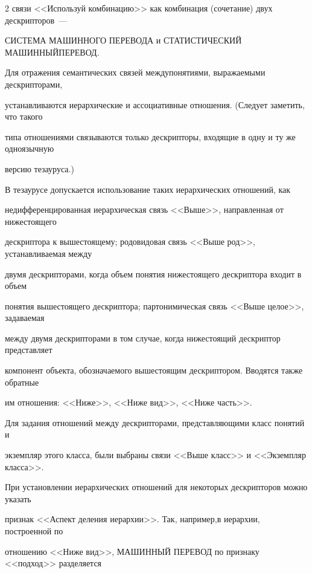 \begin{multicols}{2}
связи <<Используй комбинацию>> как комбинация (сочетание) двух дескрипторов~--- 

СИСТЕМА МАШИННОГО ПЕРЕВОДА и СТАТИСТИЧЕСКИЙ МАШИННЫЙ\linebreak  ПЕРЕВОД.

{ %



}

  

  Для отражения семантических связей между\linebreak понятиями, выражаемыми дескрипторами, 

уста\-нав\-ли\-ва\-ют\-ся иерархические и ассоциативные отношения. (Следует заметить, что такого 

типа отношениями связываются только дескрипторы, входящие в одну и ту же одноязычную 

версию тезауруса.)

  

  В тезаурусе допускается использование таких иерархических отношений, как 

недифференцированная иерархическая связь <<Выше>>, направленная от нижестоящего 

дескриптора к вышестоящему; родовидовая связь <<Выше род>>, устанавливаемая между 

двумя дескрипторами, когда объем понятия нижестоящего дескриптора входит в объем 

понятия вышестоящего дескриптора; партонимическая связь <<Выше целое>>, задаваемая 

между двумя дескрипторами в том случае, когда нижестоящий дескриптор представляет 

компонент объекта, обозначаемого вышестоящим дескриптором. Вводятся также обратные 

им отношения: <<Ниже>>, <<Ниже вид>>, <<Ниже часть>>. 

  

  Для задания отношений между дескрипторами, представляющими класс понятий и 

экземпляр этого класса, были выбраны связи <<Выше класс>> и <<Экземпляр класса>>.

  

  При установлении иерархических отношений для некоторых дескрипторов можно указать 

признак <<Аспект деления иерархии>>. Так, например,\linebreak в иерархии, построенной по 

отношению <<\mbox{Ниже} вид>>, МАШИННЫЙ ПЕРЕВОД по признаку <<подход>> разделяется 


\end{multicols}
